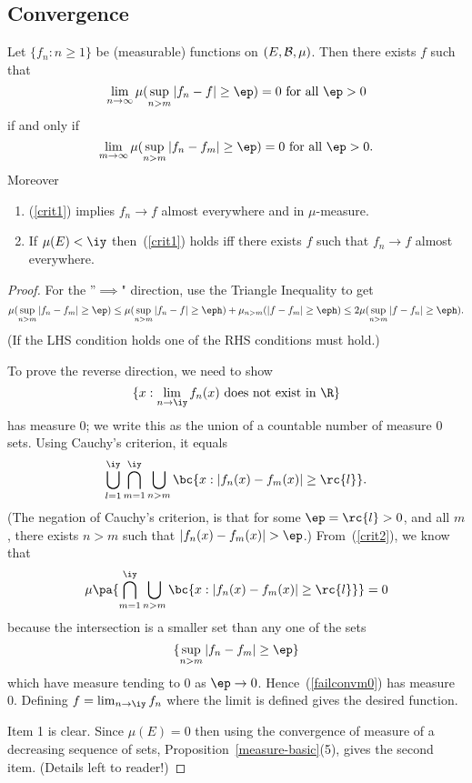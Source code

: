 
\subsection{Convergence}
\begin{lem}\label{ccfmf}
Let $\{f_n:n\ge 1\}$ be (measurable) functions on $(E,\cal B, \mu)$. Then there exists $f$ such that
\begin{equation}\label{crit1}
\lim_{n\to \infty} \mu(\sup_{n>m}|f_n-f|\ge \ep)=0\text{ for all }\ep>0
\end{equation}
if and only if
\begin{equation}\label{crit2}
\lim_{m\to \infty}\mu(\sup_{n>m}|f_n-f_m|\ge \ep)=0\text{ for all }\ep>0.
\end{equation}
Moreover
\begin{enumerate}
\item
(\ref{crit1}) implies $f_n\to f$ almost everywhere and in $\mu$-measure.
\item
If $\mu(E)<\iy$ then~(\ref{crit1}) holds iff there exists $f$ such that $f_n\to f$ almost everywhere.
\end{enumerate}
\end{lem}
\begin{proof}
For the ''$\implies$" direction, use the Triangle Inequality to get
\[
\mu(\sup_{n>m} |f_n-f_m|\ge \ep)\le
\mu(\sup_{n>m} |f_n-f|\ge \eph)+\mu_{n>m}(|f-f_m|\ge \eph) \le 2\mu(\sup_{n>m}|f-f_n|\ge \eph).
\]
(If the LHS condition holds one of the RHS conditions must hold.)

To prove the reverse direction, we need to show
\[
\{x:\lim_{n\to \iy} f_n(x)\text{ does not exist in }\R\}
\]
has measure 0; we write this as the union of a countable number of measure 0 sets. Using Cauchy's criterion, it equals
\[
\bigcup_{l=1}^{\iy} \bigcap_{m=1}^{\iy} \bigcup_{n>m} \bc{x:|f_n(x)-f_m(x)|\ge \rc{l}}.
\]
(The negation of Cauchy's criterion, is that for some $\ep=\rc{l}>0$, and all $m$, there exists $n>m$ such that $|f_n(x)-f_m(x)|>\ep$.) From~(\ref{crit2}), we know that 
\begin{equation}
\label{failconvm0}
\mu\pa{
\bigcap_{m=1}^{\iy} \bigcup_{n>m} \bc{x:|f_n(x)-f_m(x)|\ge \rc{l}}
}=0
\end{equation}
because the intersection is a smaller set than any one of the sets
\[
\{
\sup_{n>m}|f_n-f_m|\ge \ep
\}
\]
which have measure tending to 0 as $\ep\to 0$.
Hence~(\ref{failconvm0}) has measure 0. Defining $f=\lim_{n\to \iy} f_n$ where the limit is defined gives the desired function.

Item 1 is clear. 
Since $\mu(E)=0$ then using the convergence of measure of a decreasing sequence of sets, Proposition~\ref{measure-basic}(5), gives the second item. (Details left to reader!)
\end{proof}
